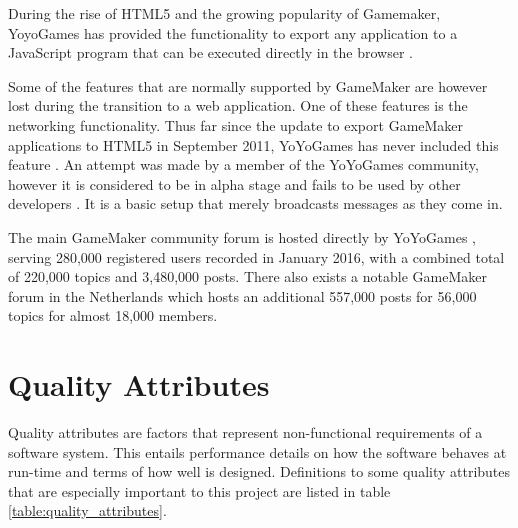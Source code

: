 \documentclass[bsc,frontabs,twoside,singlespacing,parskip,deptreport]{infthesis}     %
\begin{document}
During the rise of HTML5 and the growing popularity of Gamemaker, YoyoGames has provided the functionality to export any application to a JavaScript program that can be executed directly in the browser \cite{GameMaker_Studio}.

Some of the features that are normally supported by GameMaker are however lost during the transition to a web application. One of these features is the networking functionality. Thus far since the update to export GameMaker applications to HTML5 in September 2011, YoYoGames has never included this feature \cite{gamemaker_missing_networking}. An attempt was made by a member of the YoYoGames community, however it is considered to be in alpha stage and fails to be used by other developers \cite{gamemaker_networking_attempt}. It is a basic setup that merely broadcasts messages as they come in.%

The main GameMaker community forum is hosted directly by YoYoGames \cite{yoyogames_forum}, serving 280,000 registered users recorded in January 2016, with a combined total of 220,000 topics and 3,480,000 posts. There also exists a notable GameMaker forum in the Netherlands \cite{dutch_gamemaker_forum} which hosts an additional 557,000 posts for 56,000 topics for almost 18,000 members.

\section{Quality Attributes}
Quality attributes are factors that represent non-functional requirements of a software system. This entails performance details on how the software behaves at run-time and terms of how well is designed. Definitions to some quality attributes that are especially important to this project are listed in table \ref{table:quality_attributes}.
 
\end{document}
